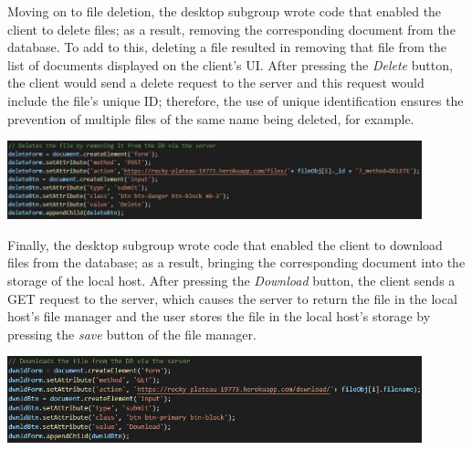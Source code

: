 \documentclass{article}
\begin{document}
Moving on to file deletion, the desktop subgroup wrote code that enabled the client to delete files; as a result, removing the corresponding document from the database. To add to this, deleting a file resulted in removing that file from the list of documents displayed on the client's UI. After pressing the \textit{Delete} button, the client would send a delete request to the server and this request would include the file's unique ID; therefore, the use of unique identification ensures the prevention of multiple files of the same name being deleted, for example. 

\includegraphics[width=12cm]{delete}

Finally, the desktop subgroup wrote code that enabled the client to download files from the database; as a result, bringing the corresponding document into the storage of the local host. After pressing the \textit{Download} button, the client sends a GET request to the server, which causes the server to return the file in the local host's file manager and the user stores the file in the local host's storage by pressing the \textit{save} button of the file manager. 

\includegraphics[width=12cm]{download}
\end{document}
